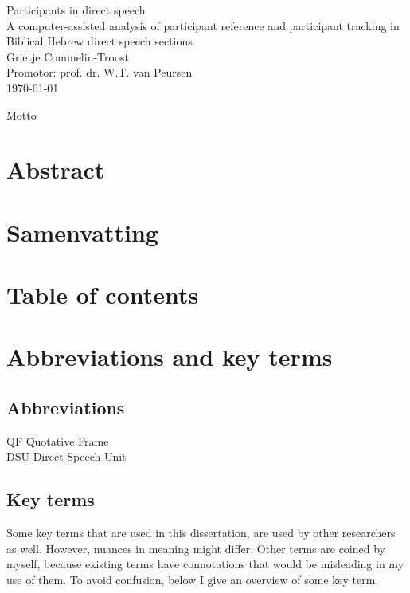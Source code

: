 \documentclass[twoside,a4paper,10pt]{article}
\newcommand{\fixme}[1]{{\color{red} #1}}
\newcommand{\myTitle}{Participants in direct speech\xspace}
\newcommand{\mySubtitle}{A computer-assisted analysis of participant reference and participant tracking in Biblical Hebrew direct speech sections\xspace}
\newcommand{\myName}{Grietje Commelin-Troost\xspace}
\begin{document}
\begin{center}
\null
\vspace*{40ex}
{\LARGE \myTitle}\\
\vspace*{10ex}
{\Large \mySubtitle}\\
\vspace*{55ex}
{\large \myName}\\
\bigskip
{\large Promotor: prof. dr. W.T. van Peursen}\\
\bigskip
\normalsize \today
\vfill
\end{center}

\newpage
\fixme{Motto}
\newpage
\section*{Abstract}
\newpage
\section*{Samenvatting}
\newpage
\section*{Table of contents}
\newpage
\section*{Abbreviations and key terms}
\subsection{Abbreviations}
\begin{tabbing}
QF \hspace{5ex} \= Quotative Frame \\
DSU \> Direct Speech Unit \\

\end{tabbing}

\subsection{Key terms}
Some key terms that are used in this dissertation, are used by other researchers as well. However, nuances in meaning might differ. Other terms are coined by myself, because existing terms have connotations that would be misleading in my use of them. To avoid confusion, below I give an overview of some key term.
\end{document}
